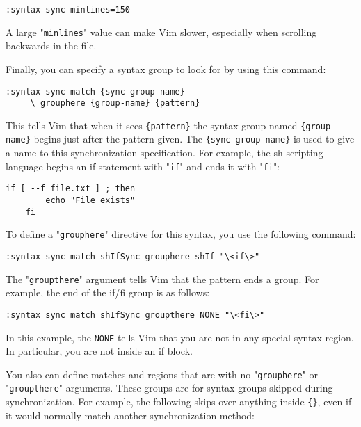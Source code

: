 \begin{Verbatim}[samepage=true]
 :syntax sync minlines=150
\end{Verbatim}

A large "\texttt{minlines}" value can make Vim slower, especially when scrolling backwards in the file.

Finally, you can specify a syntax group to look for by using this command:

\begin{Verbatim}[samepage=true]
 :syntax sync match {sync-group-name}
     \ grouphere {group-name} {pattern}
\end{Verbatim}

This tells Vim that when it sees \texttt{\{pattern\}} the syntax group named \texttt{\{group-name\}} begins just after the pattern given.
The \texttt{\{sync-group-name\}} is used to give a name to this synchronization specification.
For example, the sh scripting language begins an if statement with "\texttt{if}" and ends it with "\texttt{fi}":

\begin{Verbatim}[samepage=true]
    if [ --f file.txt ] ; then 
        echo "File exists" 
    fi 
\end{Verbatim}

To define a "\texttt{grouphere}" directive for this syntax, you use the following command:

\begin{Verbatim}[samepage=true]
 :syntax sync match shIfSync grouphere shIf "\<if\>"
\end{Verbatim}

The "\texttt{groupthere}" argument tells Vim that the pattern ends a group.
For example, the end of the if/fi group is as follows:

\begin{Verbatim}[samepage=true]
 :syntax sync match shIfSync groupthere NONE "\<fi\>"
\end{Verbatim}

In this example, the \texttt{NONE} tells Vim that you are not in any special syntax region.
In particular, you are not inside an if block.

You also can define matches and regions that are with no "\texttt{grouphere}" or "\texttt{groupthere}" arguments.
These groups are for syntax groups skipped during synchronization.
For example, the following skips over anything inside \texttt{\{\}}, even if it would normally match another synchronization method:

